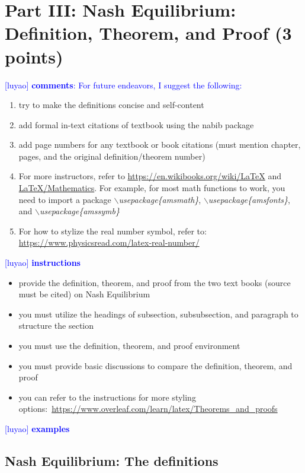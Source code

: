 \documentclass[runningheads]{llncs}
\newcommand{\luyao}[1]{\textcolor{blue}{[luyao] #1}}
\newcommand{\luyao}[1]{}
\begin{document}
\section{Part III: Nash Equilibrium: Definition, Theorem, and Proof (3 points)}

\luyao{\textbf{comments}: For future endeavors, I suggest the following:}
\begin{enumerate}
    \item try to make the definitions concise and self-content
    \item add formal in-text citations of textbook using the nabib package
    \item add page numbers for any textbook or book citations (must mention chapter, pages, and the original definition/theorem number)
    \item For more instructors, refer to \href{https://en.wikibooks.org/wiki/LaTeX}{https://en.wikibooks.org/wiki/LaTeX} and \href{https://en.wikibooks.org/wiki/LaTeX/Mathematics}{LaTeX/Mathematics}. For example, for most math functions to work, you need to import a package \textit{$\backslash$usepackage\{amsmath\}}, \textit{$\backslash$usepackage\{amsfonts\}}, and \textit{$\backslash$usepackage\{amssymb\}}
    \item For how to stylize the real number symbol, refer to: \url{https://www.physicsread.com/latex-real-number/}
\end{enumerate}


\noindent\luyao{\textbf{instructions}}

\begin{itemize}
    \item provide the definition, theorem, and proof from the two text books (source must be cited) on Nash Equilibrium
    \item you must utilize the headings of subsection, subsubsection, and paragraph to structure the section
    \item you must use the definition, theorem, and proof environment
    \item you must provide basic discussions to compare the definition, theorem, and proof 
    \item you can refer to the instructions for more styling options:~\url{https://www.overleaf.com/learn/latex/Theorems_and_proofs}
\end{itemize}



\newpage
\noindent\luyao{\textbf{examples}}
\subsection{Nash Equilibrium: The definitions}
\end{document}
